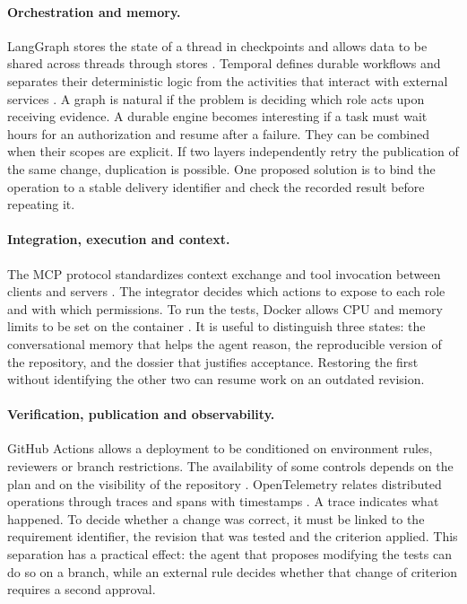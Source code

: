 \documentclass[11pt,a4paper]{article}
\begin{document}
\paragraph{Orchestration and memory.}
LangGraph stores the state of a thread in checkpoints and allows data to be shared across threads through stores \citep{langgraph}. Temporal defines durable workflows and separates their deterministic logic from the activities that interact with external services \citep{temporal}. A graph is natural if the problem is deciding which role acts upon receiving evidence. A durable engine becomes interesting if a task must wait hours for an authorization and resume after a failure. They can be combined when their scopes are explicit. If two layers independently retry the publication of the same change, duplication is possible. One proposed solution is to bind the operation to a stable delivery identifier and check the recorded result before repeating it.

\paragraph{Integration, execution and context.}
The MCP protocol standardizes context exchange and tool invocation between clients and servers \citep{mcp}. The integrator decides which actions to expose to each role and with which permissions. To run the tests, Docker allows CPU and memory limits to be set on the container \citep{docker}. It is useful to distinguish three states: the conversational memory that helps the agent reason, the reproducible version of the repository, and the dossier that justifies acceptance. Restoring the first without identifying the other two can resume work on an outdated revision.

\paragraph{Verification, publication and observability.}
GitHub Actions allows a deployment to be conditioned on environment rules, reviewers or branch restrictions. The availability of some controls depends on the plan and on the visibility of the repository \citep{actions}. OpenTelemetry relates distributed operations through traces and spans with timestamps \citep{otel}. A trace indicates what happened. To decide whether a change was correct, it must be linked to the requirement identifier, the revision that was tested and the criterion applied. This separation has a practical effect: the agent that proposes modifying the tests can do so on a branch, while an external rule decides whether that change of criterion requires a second approval.
\end{document}

